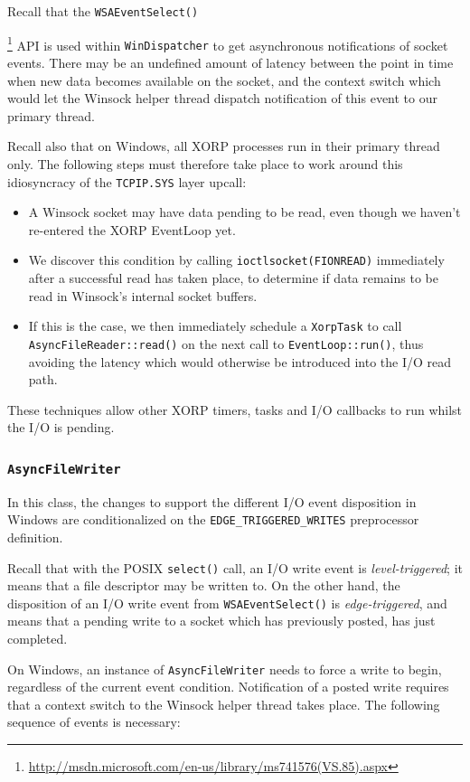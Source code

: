 \documentclass[11pt]{article}
\begin{document}
Recall that the {\tt WSAEventSelect()}
{\footnote{\url{http://msdn.microsoft.com/en-us/library/ms741576(VS.85).aspx}}
API is used within {\tt WinDispatcher}
to get asynchronous notifications of socket events.
There may be an undefined amount of latency between
the point in time when new data becomes available on the socket,
and the context switch which would let the Winsock helper thread
dispatch notification of this event to our primary thread.

Recall also that on Windows, all XORP processes run in their primary thread only.
The following steps must therefore take place to work around this idiosyncracy
of the {\tt TCPIP.SYS} layer upcall:
\begin{itemize}
 \item A Winsock socket may have data pending to be read,
even though we haven't re-entered the XORP EventLoop yet.
 \item We discover this condition by calling
{\tt ioctlsocket(FIONREAD)} immediately after
a successful read has taken place, to determine if data remains to
be read in Winsock's internal socket buffers.
 \item If this is the case, we then immediately schedule a
{\tt XorpTask} to call
{\tt AsyncFileReader::read()}
on the next call to
{\tt EventLoop::run()},
thus avoiding the latency which would otherwise be introduced
into the I/O read path.
\end{itemize}

These techniques allow other XORP timers, tasks and I/O callbacks to run
whilst the I/O is pending.


\subsubsection{{\tt AsyncFileWriter}}

In this class, the changes to support the different I/O event disposition in
Windows are conditionalized on the
{\tt EDGE\_TRIGGERED\_WRITES}
preprocessor definition.

Recall that with the POSIX {\tt select()} call, an I/O write event is
{\em level-triggered}; it means that a file descriptor may be written to.
On the other hand, the disposition of an I/O write event from
{\tt WSAEventSelect()} is {\em edge-triggered}, and means that a pending
write to a socket which has previously posted, has just completed.

On Windows, an instance of {\tt AsyncFileWriter} needs to force a write to begin,
regardless of the current event condition.
Notification of a posted write requires that a context switch to
the Winsock helper thread takes place.
The following sequence of events is necessary:

}
\end{document}
